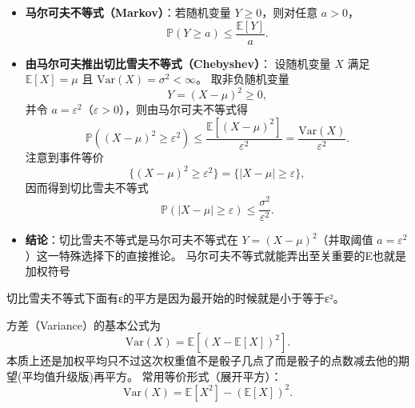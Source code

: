 \begin{dxtips}
    \begin{itemize}
  \item \textbf{马尔可夫不等式（Markov）}：若随机变量 $Y\ge 0$，则对任意 $a>0$，
  \[
    \mathbb P(Y\ge a)\le \frac{\mathbb E[Y]}{a}.
  \]

  \item \textbf{由马尔可夫推出切比雪夫不等式（Chebyshev）}：
  设随机变量 $X$ 满足 $\mathbb E[X]=\mu$ 且 $\mathrm{Var}(X)=\sigma^2<\infty$。
  取非负随机变量
  \[
    Y=(X-\mu)^2 \ge 0,
  \]
  并令 $a=\varepsilon^2$（$\varepsilon>0$），则由马尔可夫不等式得
  \[
    \mathbb P\!\left((X-\mu)^2 \ge \varepsilon^2\right)
    \le
    \frac{\mathbb E\!\left[(X-\mu)^2\right]}{\varepsilon^2}
    =
    \frac{\mathrm{Var}(X)}{\varepsilon^2}.
  \]
  注意到事件等价
  \[
    \{(X-\mu)^2 \ge \varepsilon^2\}=\{|X-\mu|\ge \varepsilon\},
  \]
  因而得到切比雪夫不等式
  \[
    \mathbb P\!\left(|X-\mu|\ge \varepsilon\right)
    \le
    \frac{\sigma^2}{\varepsilon^2}.
  \]

  \item \textbf{结论}：切比雪夫不等式是马尔可夫不等式在
  $Y=(X-\mu)^2$（并取阈值 $a=\varepsilon^2$）这一特殊选择下的直接推论。
  马尔可夫不等式就能弄出至关重要的E也就是加权符号
\end{itemize}
\end{dxtips}
\begin{dxtips}
    切比雪夫不等式下面有ε的平方是因为最开始的时候就是小于等于ε²。
\end{dxtips}
\begin{dxtips}[方差深刻理解]
   方差（Variance）的基本公式为
\[
\mathrm{Var}(X)=\mathbb E\!\left[(X-\mathbb E[X])^{2}\right].
\]
本质上还是加权平均只不过这次权重值不是骰子几点了而是骰子的点数减去他的期望(平均值升级版)再平方。
常用等价形式（展开平方）：
\[
\mathrm{Var}(X)=\mathbb E[X^{2}]-(\mathbb E[X])^{2}.
\]

\end{dxtips}

